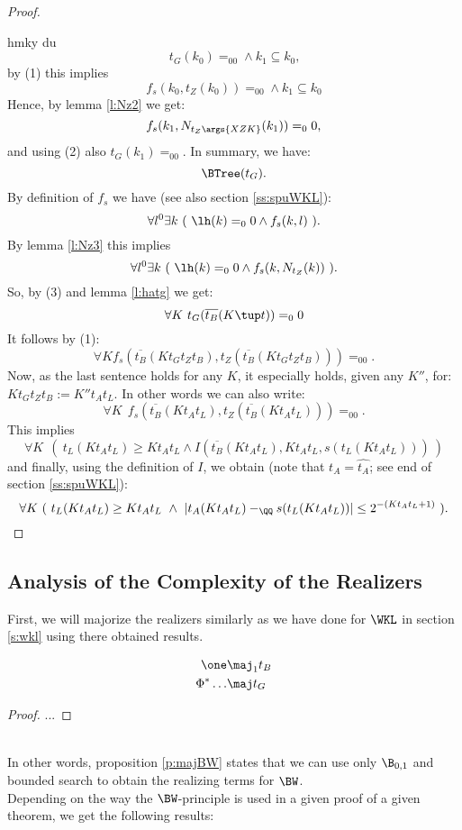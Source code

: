 \begin{proof}
\begin{itemize}
\end{itemize}
hmky du
\[
t_G(k_0)=_00 \wedge k_1\subseteq k_0
\text{,}
\]
by (1) this implies
\[
f_s(k_0,t_Z(k_0))=_00 \wedge k_1\subseteq k_0
\text{}
\]
%
%
Hence, by lemma \ref{l:Nz2} we get:
\[
f_s(k_1,N_{t_Z\args{XZK}}(k_1))=_00
\text{,}
\]
and using (2) also $t_G(k_1)=_00$. In summary, we have:
\[
\BTree(t_G)
\text{.}
\]
By definition of $f_s$ we have (see also section \ref{ss:spuWKL}):
\[
\forall l^0 \exists k\ (\ \lh(k)=_00 \wedge f_s(k,l)\ )
\text{.}
\]
By lemma \ref{l:Nz3} this implies
\[
\forall l^0 \exists k\ (\ \lh(k)=_00 \wedge f_s(k,N_{t_Z}(k))\ )
\text{.}
\]
So, by (3) and lemma \ref{l:hatg} we get:
\[
 \forall K\ t_G(\overline{t_B}(K\tup t))=_00
\]
It follows by (1):
\[
 \forall K f_s(\overline{t_B}(Kt_Gt_Zt_B), t_Z(\overline{t_B}(Kt_Gt_Zt_B)))=_00
\text{.}
\]
Now, as the last sentence holds for any $K$, it especially holds, given any $K''$, for:
$Kt_Gt_Zt_B:=K''t_At_L$. In other words we can also write:
\[
\forall K\ \ f_s(\overline{t_B}(Kt_At_L), t_Z(\overline{t_B}(Kt_At_L)))=_00
\text{.}
\]
This implies 
\[
\forall K\ \ 
(\ t_L(Kt_At_L) \geq  Kt_At_L \wedge I(\overline{t_B}(Kt_At_L), Kt_At_L, s(t_L(Kt_At_L)))\ )
\text{}
\]
and finally, using the definition of $I$, we obtain (note that $t_A=\widehat {t_A}$; 
see end of section \ref{ss:spuWKL}):
\[
\forall K\ 
(\ t_L(Kt_At_L) \geq  Kt_At_L\  \wedge\ 
|t_A(Kt_At_L)-_\QQ s(t_L(Kt_At_L))|\leq2^{-(Kt_At_L+1)}\ )
\text{.}
\]
\end{proof}
%


\subsection {Analysis of the Complexity of the Realizers} \label{ss:acr}

First, we will majorize the realizers similarly as we have done for $\WKL$ 
in section \ref{s:wkl} using there obtained results.\\
\begin{prop}\label{p:majBW}
\begin{align*}
\one&\maj_1 t_B\\
\Phi^* \ldots &\maj t_G\\
\end{align*}
\end{prop}
\begin{proof}
...
\end{proof}\\
In other words, proposition \ref{p:majBW} states that we can use only $\B_{0,1}$
and bounded search to obtain the realizing terms for $\BW$.\\
Depending on the way the $\BW$-principle is used in a given proof of a given
theorem, we get the following results:

